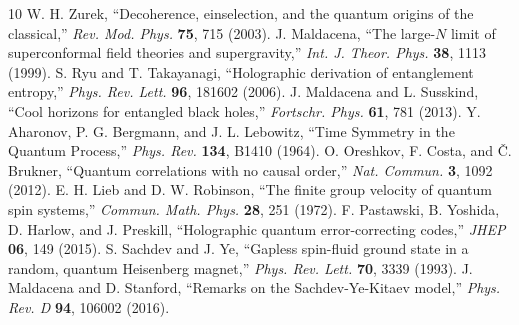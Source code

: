 \documentclass[11pt]{article}
\begin{document}
\begin{thebibliography}{10}\setlength{\itemsep}{2pt}
 W. H. Zurek, ``Decoherence, einselection, and the quantum origins of the classical,'' \emph{Rev. Mod. Phys.} \textbf{75}, 715 (2003).
 J. Maldacena, ``The large-$N$ limit of superconformal field theories and supergravity,'' \emph{Int. J. Theor. Phys.} \textbf{38}, 1113 (1999).
 S. Ryu and T. Takayanagi, ``Holographic derivation of entanglement entropy,'' \emph{Phys. Rev. Lett.} \textbf{96}, 181602 (2006).
 J. Maldacena and L. Susskind, ``Cool horizons for entangled black holes,'' \emph{Fortschr. Phys.} \textbf{61}, 781 (2013).
 Y. Aharonov, P. G. Bergmann, and J. L. Lebowitz, ``Time Symmetry in the Quantum Process,'' \emph{Phys. Rev.} \textbf{134}, B1410 (1964).
 O. Oreshkov, F. Costa, and \v{C}. Brukner, ``Quantum correlations with no causal order,'' \emph{Nat. Commun.} \textbf{3}, 1092 (2012).
 E. H. Lieb and D. W. Robinson, ``The finite group velocity of quantum spin systems,'' \emph{Commun. Math. Phys.} \textbf{28}, 251 (1972).
 F. Pastawski, B. Yoshida, D. Harlow, and J. Preskill, ``Holographic quantum error-correcting codes,'' \emph{JHEP} \textbf{06}, 149 (2015).
 S. Sachdev and J. Ye, ``Gapless spin-fluid ground state in a random, quantum Heisenberg magnet,'' \emph{Phys. Rev. Lett.} \textbf{70}, 3339 (1993).
 J. Maldacena and D. Stanford, ``Remarks on the Sachdev-Ye-Kitaev model,'' \emph{Phys. Rev. D} \textbf{94}, 106002 (2016).
\end{thebibliography}
\end{document}

